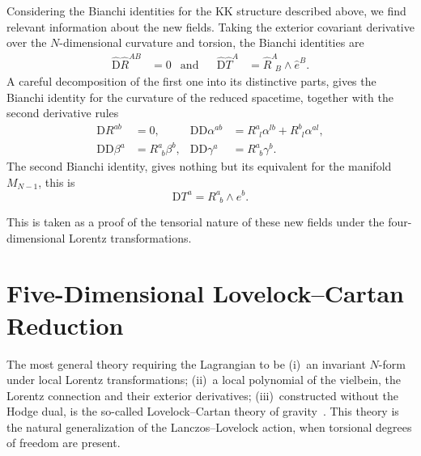 \documentclass[aps,prd,12pt,superscriptaddress,showpacs,showkeys,longbibliography,reprint,nofootinbib]{revtex4-1}
\begin{document}
Considering the Bianchi identities for the KK structure described above, we find relevant information about the new fields. Taking the exterior covariant derivative over the $N$-dimensional curvature and torsion, the Bianchi identities are
\begin{align*}
  \hat{\text{D}}\hat{R}^{AB} &= 0 &\mbox{and}& &\hat{\text{D}}\hat{T}^A &= \hat{R}^A_{\ \ B}\wedge\hat{e}^B.
\end{align*}
A careful decomposition of the first one into its distinctive parts, gives the Bianchi identity for the curvature of the reduced spacetime, together with the second derivative rules
\begin{align*}
  \text{D}R^{ab} &=0, & \text{D}\mbox{D}\alpha^{ab} &=R^a_{\ \ l}\alpha^{lb}+R^b_{\ \ l}\alpha^{al},\\
  \text{D}\text{D}\beta^a &= R^a_{\ \ b}\beta^{b}, & \text{D}\text{D}\gamma^a &= R^a_{\ \ b}\gamma^{b}.
\end{align*}
The second Bianchi identity, gives nothing but its equivalent for the manifold $M_{N-1}$, this is
\begin{equation*}
  \mbox{D}T^a=R^a_{\ \ b}\wedge e^b.
\end{equation*}

This is taken as a proof of the tensorial nature of these new fields under the four-dimensional Lorentz transformations.

\section{Five-Dimensional Lovelock--Cartan Reduction\label{5EGB}}

The most general theory requiring the Lagrangian to be (i)~an invariant $N$-form under local Lorentz transformations; (ii)~a local polynomial of the vielbein, the Lorentz connection and their exterior derivatives; (iii)~constructed without the Hodge dual, is the so-called Lovelock--Cartan theory of gravity~\cite{Mardones:1990qc}. This theory is the natural generalization of the Lanczos--Lovelock action, when torsional degrees of freedom are present. 
\end{document}
